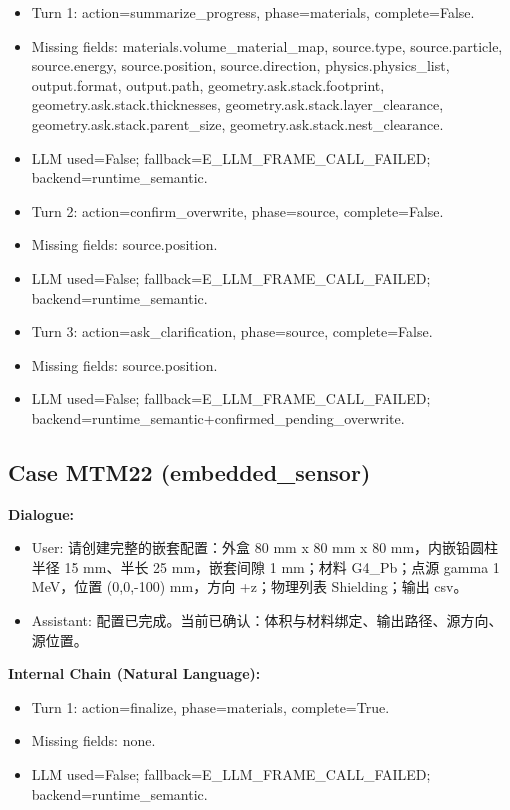 \documentclass[11pt]{ctexart}
\begin{document}
\begin{itemize}
\item Turn 1: action=summarize\_progress, phase=materials, complete=False.
\item Missing fields: materials.volume\_material\_map, source.type, source.particle, source.energy, source.position, source.direction, physics.physics\_list, output.format, output.path, geometry.ask.stack.footprint, geometry.ask.stack.thicknesses, geometry.ask.stack.layer\_clearance, geometry.ask.stack.parent\_size, geometry.ask.stack.nest\_clearance.
\item LLM used=False; fallback=E\_LLM\_FRAME\_CALL\_FAILED; backend=runtime\_semantic.
\item Turn 2: action=confirm\_overwrite, phase=source, complete=False.
\item Missing fields: source.position.
\item LLM used=False; fallback=E\_LLM\_FRAME\_CALL\_FAILED; backend=runtime\_semantic.
\item Turn 3: action=ask\_clarification, phase=source, complete=False.
\item Missing fields: source.position.
\item LLM used=False; fallback=E\_LLM\_FRAME\_CALL\_FAILED; backend=runtime\_semantic+confirmed\_pending\_overwrite.
\end{itemize}
\subsection{Case MTM22 (embedded\_sensor)}
\textbf{Dialogue:}
\begin{itemize}
\item User: 请创建完整的嵌套配置：外盒 80 mm x 80 mm x 80 mm，内嵌铅圆柱半径 15 mm、半长 25 mm，嵌套间隙 1 mm；材料 G4\_Pb；点源 gamma 1 MeV，位置 (0,0,-100) mm，方向 +z；物理列表 Shielding；输出 csv。
\item Assistant: 配置已完成。当前已确认：体积与材料绑定、输出路径、源方向、源位置。
\end{itemize}
\textbf{Internal Chain (Natural Language):}
\begin{itemize}
\item Turn 1: action=finalize, phase=materials, complete=True.
\item Missing fields: none.
\item LLM used=False; fallback=E\_LLM\_FRAME\_CALL\_FAILED; backend=runtime\_semantic.
\end{itemize}
\end{document}
